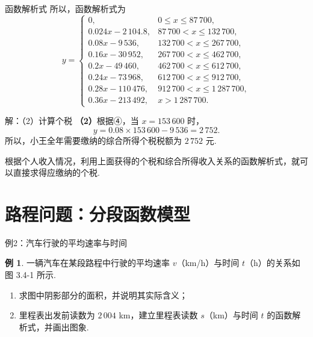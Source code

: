 \documentclass[aspectratio=169,13pt,t] {beamer}
\theoremstyle{definition}
\newtheorem{exam}{例}
\begin{document}
\begin{frame}{函数解析式}
	所以，函数解析式为
	\begin{equation}
		y = \begin{cases}
			0, & 0 \leqslant x \leqslant 87\,700, \\
			0.024x - 2\,104.8, & 87\,700 < x \leqslant 132\,700, \\
			0.08x - 9\,536, & 132\,700 < x \leqslant 267\,700, \\
			0.16x - 30\,952, & 267\,700 < x \leqslant 462\,700, \\
			0.2x - 49\,460, & 462\,700 < x \leqslant 612\,700, \\
			0.24x - 73\,968, & 612\,700 < x \leqslant 912\,700, \\
			0.28x - 110\,476, & 912\,700 < x \leqslant 1\,287\,700, \\
			0.36x - 213\,492, & x > 1\,287\,700.
		\end{cases} \tag{④}
	\end{equation}
\end{frame}



\begin{frame}{解：（2）计算个税}
	\textbf{（2）}根据④，当 \(x=153\,600\) 时，
	\[
	y = 0.08 \times 153\,600 - 9\,536 = 2\,752.
	\]
	所以，小王全年需要缴纳的综合所得个税税额为 \(2\,752\) 元.
	
	\vspace{1em}
	根据个人收入情况，利用上面获得的个税和综合所得收入关系的函数解析式，就可以直接求得应缴纳的个税.
\end{frame}
\section{路程问题：分段函数模型}

\begin{frame}{例2：汽车行驶的平均速率与时间}
	\begin{exam}
		一辆汽车在某段路程中行驶的平均速率 $v$（km/h）与时间 $t$（h）的关系如图 3.4-1 所示.
		\begin{enumerate}[(1)]
			\item 求图中阴影部分的面积，并说明其实际含义；
			\item 里程表出发前读数为 $2\,004$ km，建立里程表读数 $s$（km）与时间 $t$ 的函数解析式，并画出图象.
		\end{enumerate}
	\end{exam}
\end{frame}
\end{document}
